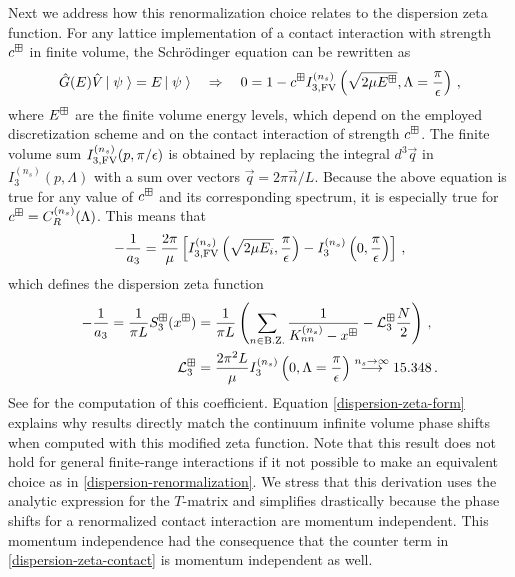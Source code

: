 Next we address how this renormalization choice relates to the dispersion zeta function.
For any lattice implementation of a contact interaction with strength $c^\boxplus$ in finite volume, the Schr\"odinger equation can be rewritten as
\begin{equation}\label{eq:schroe}
	\hat G(E) \hat V \left|\;\psi\;\right\rangle = E\left|\;\psi\;\right\rangle
	\quad \Rightarrow \quad
	0 = 1 - c^\boxplus I_{3, \textrm{FV}}^{(n_s)}\left(\sqrt{2 \mu E^\boxplus}, \Lambda = \frac{\pi}{\epsilon}\right) \, ,
\end{equation}
where $E^\boxplus$ are the finite volume energy levels, which depend on the employed discretization scheme and on the contact interaction of strength $c^\boxplus$.
The finite volume sum $I_{3, \textrm{FV}}^{(n_s)}(p, \pi/\epsilon)$ is obtained by replacing the integral $d^3 \vec q$ in $I_3^{(n_s)}(p, \Lambda)$ with a sum  over vectors $\vec q = 2 \pi \vec n / L$.
Because the above equation is true for any value of $c^\boxplus$ and its corresponding spectrum, it is especially true for $c^\boxplus = C_R^{(n_s)}(\Lambda)$.
This means that
\begin{equation}
	- \frac{1}{a_3}
	=
	\frac{2 \pi}{\mu}
		\left[
		I_{3, \textrm{FV}}^{(n_s)}\left(\sqrt{2 \mu E_i}, \frac{\pi}{\epsilon}\right)
		- I_3^{(n_s)}\left(0, \frac{\pi}{\epsilon}\right)
		\right]
	\, ,
\end{equation}
which defines the dispersion zeta function
\begin{align}\label{eq:dispersion-zeta-form}
	- \frac{1}{a_3}
	=
	\frac{1}{\pi L}
	S^{\boxplus}_3(x^\boxplus)
	&=\frac{1}{\pi L}\left(\sum\limits_{n \in \text{B.Z.}}\frac{1}{K_{nn}^{(n_s)} - x^\boxplus} - \mathcal{L}_3^{\boxplus} \frac{N}{2}\right)
	\, ,
	\\ \label{eq:dispersion-zeta-contact}
	\mathcal{L}_3^\boxplus
	&=
	\frac{2 \pi^2 L}{\mu}
	I_3^{(n_s)}\left(0, \Lambda = \frac{\pi}{\epsilon}\right)
	\overset{n_s\to\infty}{\longrightarrow} 15.348
	\, .
\end{align}
See  for the computation of this coefficient.
Equation \eqref{dispersion-zeta-form} explains why results directly match the continuum infinite volume phase shifts when computed with this modified zeta function.
Note that this result does not hold for general finite-range interactions if it not possible to make an equivalent choice as in \eqref{dispersion-renormalization}.
We stress that this derivation uses the analytic  expression for the $T$-matrix and simplifies drastically because the phase shifts for a renormalized contact interaction are momentum independent.
This momentum independence had the consequence that the counter term in \eqref{dispersion-zeta-contact} is momentum independent as well.

